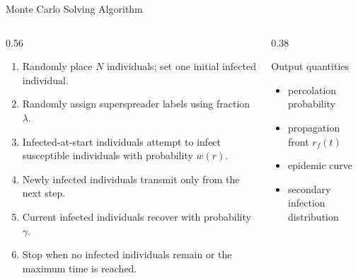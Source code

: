 \documentclass[aspectratio=169,10pt]{beamer}
\begin{document}
\begin{frame}{Monte Carlo Solving Algorithm}
  \begin{columns}[T,totalwidth=\linewidth]
    \begin{column}{0.56\linewidth}
      \begin{enumerate}
        \item Randomly place $N$ individuals; set one initial infected individual.
        \item Randomly assign superspreader labels using fraction $\lambda$.
        \item Infected-at-start individuals attempt to infect susceptible individuals with probability $w(r)$.
        \item Newly infected individuals transmit only from the next step.
        \item Current infected individuals recover with probability $\gamma$.
        \item Stop when no infected individuals remain or the maximum time is reached.
      \end{enumerate}
    \end{column}
    \begin{column}{0.38\linewidth}
      \begin{block}{Output quantities}
        \begin{itemize}
          \item percolation probability
          \item propagation front $r_f(t)$
          \item epidemic curve
          \item secondary infection distribution
        \end{itemize}
      \end{block}
      \vspace{0.3em}
    \end{column}
  \end{columns}
\end{frame}
\end{document}

